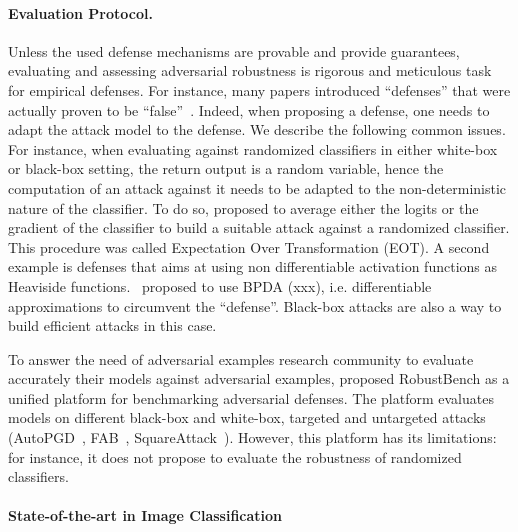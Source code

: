 \paragraph{Evaluation Protocol.}

Unless the used defense mechanisms are provable and provide guarantees, evaluating and assessing adversarial robustness is rigorous and meticulous task for empirical defenses. For instance, many papers introduced ``defenses'' that were actually proven to be ``false''~\citep{athalye2018obfuscated,carlini2019evaluating}. Indeed, when proposing a defense, one needs to adapt the attack model to the defense. We describe the following common issues. For instance, when evaluating against randomized classifiers in either white-box or black-box setting, the return output is a random variable, hence the computation of an attack against it needs to be adapted to the non-deterministic nature of the classifier. To do so, \cite{athalye2018obfuscated} proposed to average either the logits or the gradient of the classifier to build a suitable attack against a randomized classifier. This procedure was called Expectation Over Transformation (EOT). A second example is defenses that aims at using non differentiable activation functions as Heaviside functions.~\cite{athalye2017synthesizing} proposed to use BPDA (xxx), i.e. differentiable approximations to circumvent the ``defense''. Black-box attacks are also a way to build efficient attacks in this case. 

To answer the need of adversarial examples research community to evaluate accurately their models against adversarial examples, \cite{croce2020robustbench} proposed RobustBench as a unified platform for benchmarking adversarial defenses. The platform evaluates models on different black-box and white-box, targeted and untargeted attacks (AutoPGD~\citep{Croce2020ReliableEO}, FAB~\citep{Croce2020MinimallyDA}, SquareAttack~\citep{andriushchenko2019square}). However, this platform has its limitations:  for instance, it  does not propose to evaluate the robustness of randomized classifiers. 

\paragraph{State-of-the-art in Image Classification}

